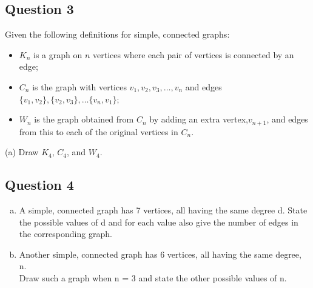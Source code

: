 \documentclass[]{article}
\begin{document}
\subsection*{Question 3}
Given the following definitions for simple, connected graphs:
\begin{itemize}
\item $K_n$ is a graph on $n$ vertices where each pair of vertices is connected by an edge;
\item $C_n$ is the graph with vertices $v_1, v_2, v_3, \dots, v_n$ and edges $\{v_1,v_2\}, \{v_2,v_3\}, \dots\{v_n, v_1\}$;
\item $W_n$ is the graph obtained from $C_n$ by adding an extra vertex,$v_{n+1}$, and edges
from this to each of the original vertices in $C_n$.
\end{itemize}
(a) Draw $K_4$, $C_4$, and $W_4$. 


\subsection*{Question 4}
\begin{enumerate}[(a)]
\item A simple, connected graph has 7 vertices, all having the same degree d.
State the possible values of d and for each value also give the number of edges
in the corresponding graph.
\item  Another simple, connected graph has 6 vertices, all having the same degree, n.\\ Draw such a graph when n = 3 and state the other possible values of n.
\end{enumerate}
\end{document}
